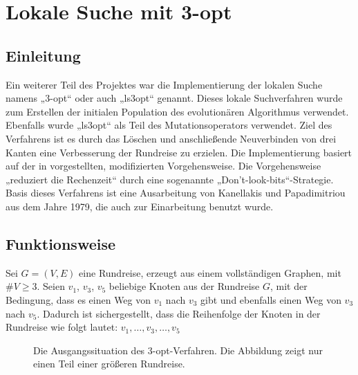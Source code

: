 \chapter{Lokale Suche mit 3-opt}
\section{Einleitung}
Ein weiterer Teil des Projektes war die Implementierung der lokalen
Suche namens „3-opt“ oder auch „ls3opt“ genannt. Dieses lokale 
Suchverfahren wurde zum Erstellen der initialen Population des 
evolutionären Algorithmus verwendet. Ebenfalls wurde „ls3opt“ als Teil
des Mutationsoperators verwendet. Ziel des Verfahrens ist es durch das 
Löschen und anschließende Neuverbinden von drei Kanten eine Verbesserung der Rundreise zu erzielen. Die Implementierung basiert auf der in
\cite{nagata} vorgestellten, modifizierten Vorgehensweise. Die Vorgehensweise „reduziert die Rechenzeit“\cite{gapx} durch
eine sogenannte „Don't-look-bits“-Strategie. Basis dieses Verfahrens ist
eine Ausarbeitung von Kanellakis und Papadimitriou\cite{ls3opt_atsp} aus dem Jahre 1979,
die auch zur Einarbeitung benutzt wurde. 

\section{Funktionsweise}
\label{ls3opt_func}
Sei $G = (V,E)$ eine Rundreise, erzeugt aus einem vollständigen Graphen,
mit $\#V \geq 3$.
Seien $v_1$, $v_3$, $v_5$ beliebige Knoten aus der Rundreise $G$, mit
der Bedingung, dass es einen Weg von $v_1$ nach $v_3$ gibt und ebenfalls
einen Weg von $v_3$ nach $v_5$. Dadurch ist sichergestellt, dass die
Reihenfolge der Knoten in der Rundreise wie folgt lautet: $v_1, \dotsc, v_3, \dotsc, v_5$
\begin{figure}[bh]
\centering
{}
\caption[Ausgangssituation 3-opt]{Die Ausgangssituation des
3-opt-Verfahren. Die Abbildung zeigt nur einen Teil einer größeren
Rundreise.}
\end {figure}

